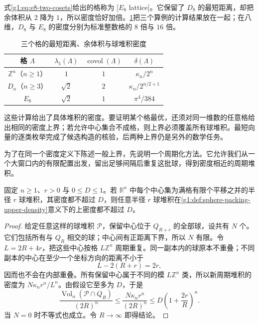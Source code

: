 式\eqref{g1:eq:e8-two-cosets}给出的格称为 [\(E_8\) lattice]。它保留了 \(D_8\) 的最短距离，却把余体积从 \(2\) 降为 \(1\)，所以密度恰好加倍。\cref{g1:tab:high-dimensional-lattice-density}把三个算例的计算结果放在一起；在八维，\(D_8\) 与 \(E_8\) 的密度分别为标准整数格的 \(8\) 倍与 \(16\) 倍。

\begin{table}[htbp]
	\centering
	\caption{三个格的最短距离、余体积与球堆积密度}
	\label{g1:tab:high-dimensional-lattice-density}
	\begin{tabular}{cccc}
		\toprule
		格 \(\Lambda\)&\(\lambda_1(\Lambda)\)&\(\operatorname{covol}(\Lambda)\)&\(\delta(\Lambda)\)\\
		\midrule
		\(\mathbb Z^n\)（\(n\ge1\)）&\(1\)&\(1\)&\(\kappa_n/2^n\)\\
		\(D_n\)（\(n\ge3\)）&\(\sqrt2\)&\(2\)&\(\kappa_n/2^{n/2+1}\)\\
		\(E_8\)&\(\sqrt2\)&\(1\)&\(\pi^4/384\)\\
		\bottomrule
	\end{tabular}
\end{table}

这些计算给出了具体堆积的密度。要证明某个格最优，还须对同一维数的任意格给出相同的密度上界；若允许中心集合不成格，则上界必须覆盖所有球堆积。最短向量的逐类枚举完成了候选构造的核验，后两种上界仍是另外的数学任务。

\ProseParagraphBreak

为了在同一个密度定义下陈述一般上界，先说明一个周期化方法。它允许我们从一个大窗口内的有限配置出发，留出足够间隔后重复这批球，得到密度相近的周期堆积。

\begin{lemma}
	\label{g1:lem:periodic-to-general-packing-bound}
	固定 \(n\ge1\)、\(r>0\) 与 \(0\le D\le1\)。若 \(\mathbb R^n\) 中每个中心集为满格有限个平移之并的半径 \(r\) 球堆积，其密度都不超过 \(D\)，则任意半径 \(r\) 球堆积在\cref{g1:def:sphere-packing-upper-density}意义下的上密度都不超过 \(D\)。
\end{lemma}
\begin{proof}
	给定任意这样的球堆积 \(\mathcal P\)，保留中心位于 \(Q_{R+r}\) 的全部球，设共有 \(N\) 个。它们包括所有与 \(Q_R\) 相交的球；中心间有正距离下界，所以 \(N\) 有限。令 \(L=2R+4r\)，把这些中心按格 \(L\mathbb Z^n\) 周期重复。同一副本内的球原本不重叠；不同副本的中心在至少一个坐标方向的距离不小于
	\[
		L-2(R+r)=2r,
	\]
	因而也不会在内部重叠。所有保留中心属于不同的模 \(L\mathbb Z^n\) 类，所以新周期堆积的密度为 \(N\kappa_n r^n/L^n\)。由假设它至多为 \(D\)，于是
	\[
		\frac{\operatorname{Vol}_n(\mathcal P\cap Q_R)}{(2R)^n}
		\le\frac{N\kappa_n r^n}{(2R)^n}
		\le D\left(1+\frac{2r}{R}\right)^n.
	\]
	当 \(N=0\) 时不等式也成立。令 \(R\to\infty\) 即得结论。
\end{proof}

